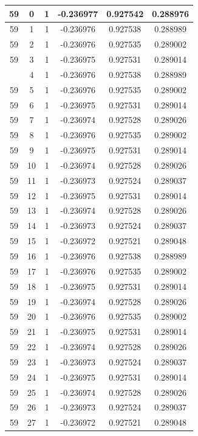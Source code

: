 \documentclass[12pt,a4paper]{article}
\numberwithin{equation}{section}
\numberwithin{figure}{section}
\numberwithin{table}{section}
\begin{document}
\begin{longtable}{|c|c|c|c|c|c|}
59 & 0 & 1 & -0.236977 & 0.927542 & 0.288976 \\ \hline
59 & 1 & 1 & -0.236976 & 0.927538 & 0.288989 \\ \hline
59 & 2 & 1 & -0.236976 & 0.927535 & 0.289002 \\ \hline
59 & 3 & 1 & -0.236975 & 0.927531 & 0.289014 \\ \hline
\pagebreak
59 & 4 & 1 & -0.236976 & 0.927538 & 0.288989 \\ \hline
59 & 5 & 1 & -0.236976 & 0.927535 & 0.289002 \\ \hline
59 & 6 & 1 & -0.236975 & 0.927531 & 0.289014 \\ \hline
59 & 7 & 1 & -0.236974 & 0.927528 & 0.289026 \\ \hline
59 & 8 & 1 & -0.236976 & 0.927535 & 0.289002 \\ \hline
59 & 9 & 1 & -0.236975 & 0.927531 & 0.289014 \\ \hline
59 & 10 & 1 & -0.236974 & 0.927528 & 0.289026 \\ \hline
59 & 11 & 1 & -0.236973 & 0.927524 & 0.289037 \\ \hline
59 & 12 & 1 & -0.236975 & 0.927531 & 0.289014 \\ \hline
59 & 13 & 1 & -0.236974 & 0.927528 & 0.289026 \\ \hline
59 & 14 & 1 & -0.236973 & 0.927524 & 0.289037 \\ \hline
59 & 15 & 1 & -0.236972 & 0.927521 & 0.289048 \\ \hline
59 & 16 & 1 & -0.236976 & 0.927538 & 0.288989 \\ \hline
59 & 17 & 1 & -0.236976 & 0.927535 & 0.289002 \\ \hline
59 & 18 & 1 & -0.236975 & 0.927531 & 0.289014 \\ \hline
59 & 19 & 1 & -0.236974 & 0.927528 & 0.289026 \\ \hline
59 & 20 & 1 & -0.236976 & 0.927535 & 0.289002 \\ \hline
59 & 21 & 1 & -0.236975 & 0.927531 & 0.289014 \\ \hline
59 & 22 & 1 & -0.236974 & 0.927528 & 0.289026 \\ \hline
59 & 23 & 1 & -0.236973 & 0.927524 & 0.289037 \\ \hline
59 & 24 & 1 & -0.236975 & 0.927531 & 0.289014 \\ \hline
59 & 25 & 1 & -0.236974 & 0.927528 & 0.289026 \\ \hline
59 & 26 & 1 & -0.236973 & 0.927524 & 0.289037 \\ \hline
59 & 27 & 1 & -0.236972 & 0.927521 & 0.289048 \\ \hline

\end{longtable}
\end{document}
